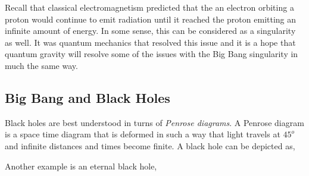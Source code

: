 \documentclass{article}
\begin{document}
Recall that classical electromagnetism predicted that the an electron orbiting a proton would continue to emit radiation until it reached the proton emitting an infinite amount of energy. In some sense, this can be considered as a singularity as well. It was quantum mechanics that resolved this issue and it is a hope that quantum gravity will resolve some of the issues with the Big Bang singularity in much the same way. \\

\subsection{Big Bang and Black Holes}

Black holes are best understood in turns of \textit{Penrose diagrams}. A Penrose diagram is a space time diagram that is deformed in such a way that light travels at $45^{o}$ and infinite distances and times become finite. A black hole can be depicted as,

\begin{center}
\end{center}

Another example is an eternal black hole,
\begin{center}
\end{center}
\begin{center}
\end{center}
\end{document}
